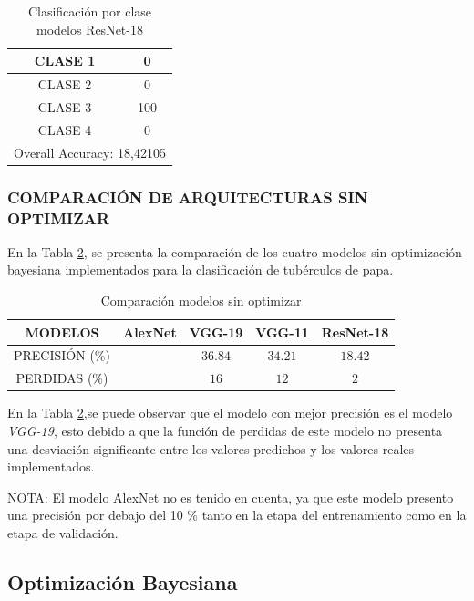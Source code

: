 		\begin{table}[htbp]
		\centering
		\begin{tabular}{|c|c|}
			\hline
			CLASE 1 & 0 \bigstrut\\
			\hline
			CLASE 2 & 0 \bigstrut\\
			\hline
			CLASE 3 & 100 \bigstrut\\
			\hline
			CLASE 4 & 0 \bigstrut\\
			\hline
			\multicolumn{2}{|c|}{Overall Accuracy: 18,42105} \bigstrut\\
			\hline
		\end{tabular}%
		\caption{Clasificación por clase modelos ResNet-18}
		\label{clase_RESNET18}
	\end{table}%


	\newpage	
	\subsubsection{\MakeUppercase{Comparación de arquitecturas sin optimizar}}
	En la Tabla \ref{table:compasin}, se presenta la comparación de los cuatro modelos sin optimización bayesiana implementados para la clasificación de tubérculos de papa.
	
	\begin{table}[ht]
		\centering
		\begin{tabular}{|c|c|c|c|c|}
			\hline
			MODELOS & AlexNet & VGG-19 & VGG-11 & ResNet-18 \\
			\hline
			PRECISIÓN (\%) &  & $$36.84$$ & $$34.21$$ & $$18.42$$ \\
			\hline
			PERDIDAS (\%) &  & $$16$$ & $$12$$ & $$2$$ \\
			\hline
		\end{tabular}	
		\caption{Comparación modelos sin optimizar}
		\label{table:compasin}
	\end{table}	
	
	En la Tabla \ref{table:compasin},se puede observar que el modelo con mejor precisión es el modelo \textit{VGG-19}, esto debido a que la función de perdidas de este modelo no presenta una desviación significante entre los valores predichos y los valores reales implementados.
	
	NOTA: El modelo AlexNet no es tenido en cuenta, ya que este modelo presento una precisión por debajo del 10 \% tanto en la etapa del entrenamiento como en la etapa de validación.

			
	\newpage
	\subsection{Optimización Bayesiana}
	
